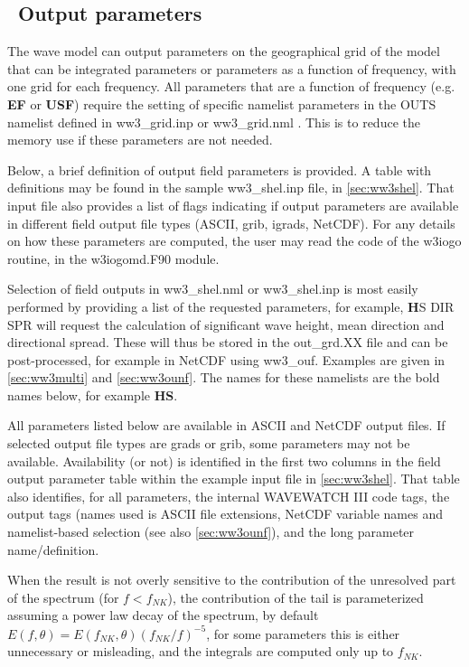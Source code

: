 \vssub
\subsection{~Output parameters} \label{sub:outpars}
\vssub

The wave model can output parameters on the geographical grid of the model that can be integrated parameters or 
parameters as a function of frequency, with one grid for each frequency. All parameters that are a function of frequency (e.g.  \textbf{EF} or \textbf{USF}) require the setting 
of specific namelist parameters in the {\F OUTS} namelist defined in ww3\_grid.inp or  ww3\_grid.nml . This is to reduce the memory use
if these parameters are not needed. 

Below, a brief definition of output field parameters is provided. A table
with definitions may be found in the sample {\code ww3\_shel.inp} file,
in \para\ref{sec:ww3shel}. That input file also provides a list of flags  
indicating if output parameters are available in different field
output file types (ASCII, grib, igrads, NetCDF). 
For any details on how these parameters are computed, the user may read the code of the  {\code w3iogo} routine, in the {\code w3iogomd.F90} module.

Selection of field outputs in {\code ww3\_shel.nml} or {\code ww3\_shel.inp} is most easily performed by providing a list of the
requested parameters, for example, {\textbf HS DIR SPR}  will request the calculation of significant wave height, mean direction and directional spread. These will thus be stored in the {\code out\_grd.XX} file and can be post-processed, for example in NetCDF using   {\code ww3\_ouf}. Examples are given in \para\ref{sec:ww3multi} and
\para\ref{sec:ww3ounf}. The names for these namelists are the bold names below, for 
example \textbf{HS}. 

All parameters listed below are available in ASCII and NetCDF output files. If selected output file types are grads or grib, some parameters may not be available. Availability (or not) is identified
in the first two columns in the field output parameter table within the example input file in  
\para\ref{sec:ww3shel}. That table also identifies, for all parameters,
the internal WAVEWATCH III code tags, the output tags (names used is ASCII 
file extensions, NetCDF variable names and namelist-based selection (see 
also \para\ref{sec:ww3ounf}), and the long parameter name/definition.

When the result is not overly sensitive to the contribution of the unresolved part of the spectrum (for $f<f_{NK}$), the contribution of the tail is parameterized assuming a power law decay of the spectrum, by default $E(f,\theta) = E(f_{NK},\theta) (f_{NK}/f)^{-5}$, for some parameters this is either unnecessary or misleading, and the integrals are computed only up to $f_{NK}$.


